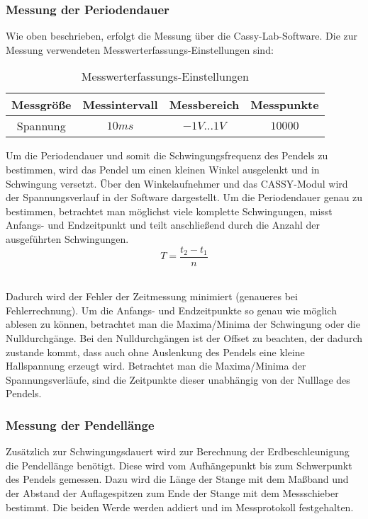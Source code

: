\documentclass[a4paper, 11pt]{article}
\begin{document}
\subsubsection{Messung der Periodendauer}
Wie oben beschrieben, erfolgt die Messung über die Cassy-Lab-Software.
Die zur Messung verwendeten Messwerterfassungs-Einstellungen sind:

\begin{table}[H]
	\large
	\centering
	\begin{tabular}{|c|c|c|c|}
		\hline 	Messgröße & Messintervall &	Messbereich & Messpunkte \\
		\hline	Spannung	&	$10ms$		&	$-1V ... 1V$ & $10000$ \\
		\hline
	\end{tabular}
	\caption{Messwerterfassungs-Einstellungen}
	\label{table:lin_Bereich}
\end{table}

 Um die Periodendauer und somit die Schwingungsfrequenz des Pendels zu bestimmen, wird das Pendel um einen kleinen Winkel ausgelenkt und in Schwingung versetzt. Über den Winkelaufnehmer und das CASSY-Modul wird der Spannungsverlauf in der Software dargestellt. Um die Periodendauer genau zu bestimmen, betrachtet man möglichst viele komplette Schwingungen, misst Anfangs- und Endzeitpunkt und teilt anschließend durch die Anzahl der ausgeführten Schwingungen.
\\
\begin{equation*}
T = \frac{t_2-t_1}{n}
\end{equation*}\

Dadurch wird der Fehler der Zeitmessung minimiert (genaueres bei Fehlerrechnung). Um die Anfangs- und Endzeitpunkte so genau wie möglich ablesen zu können, betrachtet man die Maxima/Minima der Schwingung oder die Nulldurchgänge. Bei den Nulldurchgängen ist der Offset zu beachten, der dadurch zustande kommt, dass auch ohne Auslenkung des Pendels eine kleine Hallspannung erzeugt wird. Betrachtet man die Maxima/Minima der Spannungsverläufe, sind die Zeitpunkte dieser unabhängig von der Nulllage des Pendels. \\

\subsubsection{Messung der Pendellänge}
Zusätzlich zur Schwingungsdauert wird zur Berechnung der Erdbeschleunigung die Pendellänge benötigt. Diese wird vom Aufhängepunkt bis zum Schwerpunkt des Pendels gemessen. Dazu wird die Länge der Stange mit dem Maßband und der Abstand der Auflagespitzen zum Ende der Stange mit dem Messschieber bestimmt. Die beiden Werde werden addiert und im Messprotokoll festgehalten. \\
\end{document}
